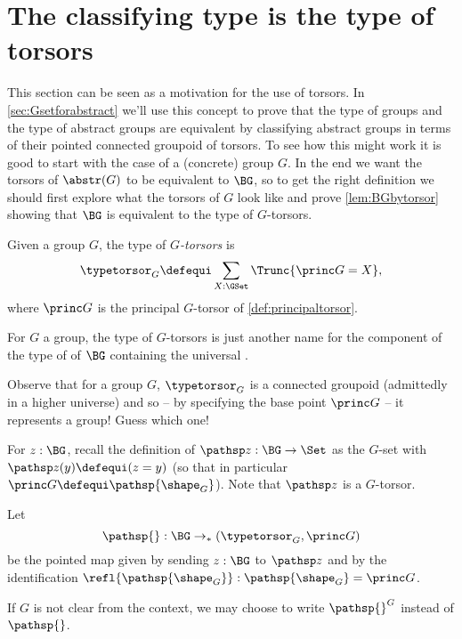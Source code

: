 \section{The classifying type is the type of torsors}
This section can be seen as a motivation for the use of torsors.
In \cref{sec:Gsetforabstract} we'll use this concept to prove that the type of groups and the type of abstract groups are equivalent by classifying abstract groups in terms of their pointed connected groupoid of torsors.  To see how this might work it is good to start with the case of a (concrete) group $G$.  In the end we want the torsors of $\abstr(G)$ to be equivalent to $\BG$, so to get the right definition we should first explore what the torsors of $G$ look like and prove \cref{lem:BGbytorsor} showing that $\BG$ is equivalent to the type of $G$-torsors.
\label{sec:torsors}
\begin{definition}
  Given a group  $G$, the type of {\em$G$-torsors} is
$$\typetorsor_G\defequi\sum_{X:\GSet}\Trunc{\princ G=X},$$
where $\princ G$ is the principal $G$-torsor of \cref{def:principaltorsor}.
\end{definition}


\begin{remark}
  For $G$ a group, the type of $G$-torsors is just another name for the component of the type of \coverings of $\BG$ containing the universal \covering.

Observe that for a group $G$, $\typetorsor_G$ is a connected groupoid (admittedly in a higher universe) and so -- by specifying the base point $\princ G$ -- it represents a group!  Guess which one!
\end{remark}

  For $z:\BG$, recall the definition of $\pathsp z:\BG\to\Set$ as the
  $G$-set with $\pathsp z(y)\defequi(z=y)$ (so that in particular
  $\princ G\defequi\pathsp{\shape_G}$).  Note that $\pathsp z$ is a $G$-torsor.

 \begin{definition}
  \label{def:BG2TorsG} Let $$\pathsp{}:\BG\to_*(\typetorsor_G,\princ G)$$ be the pointed map given by sending $z:\BG$ to $\pathsp z$ and by the identification $\refl{\pathsp{\shape_G}}:\pathsp{\shape_G}=\princ G$.
\end{definition}
If $G$ is not clear from the context, we may choose to write $\pathsp{}^G$ instead of $\pathsp{}$.

